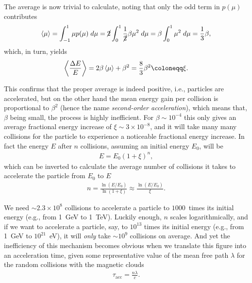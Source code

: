 The average is now trivial to calculate, noting that only the odd term in $p(\mu)$
contributes
\begin{align*}
  \left<\mu\right> = \int_{-1}^1 \mu p(\mu) \;d{\mu} =
  \cancel{2} \int_{0}^1 \frac{1}{\cancel{2}} \beta \mu^2 \;d{\mu} =
  \beta \int_0^1 \mu^2 \;d{\mu} =
  \frac{1}{3} \beta,
\end{align*}
which, in turn, yields
\begin{align}\label{eq:fermi_average}
  \left< \frac{\Delta E}{E} \right> = 2 \beta \ave{\mu} + \beta^2 =
  \frac{8}{3} \beta^2 \coloneqq \xi.
\end{align}

This confirms that the proper average is indeed positive, i.e., particles are accelerated,
but on the other hand the mean energy gain per collision is proportional to $\beta^2$
(hence the name \emph{second-order acceleration}), which means that, $\beta$ being
small, the process is highly inefficient. For $\beta \sim 10^{-4}$ this only gives
an average fractional energy increase of $\xi \sim 3 \times 10^{-8}$, and it will
take many many collisions for the particle to experience a noticeable fractional
energy increase. In fact the energy $E$ after $n$ collisions, assuming an initial
energy $E_0$, will be
\begin{align*}
  E = E_0 \left( 1 + \xi \right)^n,
\end{align*}
which can be inverted to calculate the average number of collisions it takes to
accelerate the particle from $E_0$ to $E$
\begin{align}\label{eq:fermi_accel_num_collisions}
  n = \frac{\ln(E / E_0)}{\ln(1 + \xi)} \approx \frac{\ln(E / E_0)}{\xi}.
\end{align}

\begin{marginfigure}
  
  \caption{Characteristic cosmic-ray escape and acceleration time as a function
  of energy. Here we assume $\tau_\text{esc} = 80$~Myr at 10~GeV, decreasing
  with energy as $(\nicefrac{E}{E_0})^{-\delta}$ and a collision mean free path
  of 0.1~pc. The shaded band indicates the interval $\delta = 0.3$--$0.6$.}
  \label{fig:fermi_accel_efficiency}
\end{marginfigure}

We need $\sim 2.3 \times 10^8$ collisions to accelerate a particle to $1000$~times
its initial energy (e.g., from 1~GeV to 1~TeV). Luckily enough, $n$ scales logarithmically,
and if we want to accelerate a particle, say, to $10^{13}$ times its initial energy
(e.g., from 1~GeV to $10^{21}$~eV), it will \emph{only} take $\sim 10^9$ collisions
on average. And yet the inefficiency of this mechanism becomes obvious when we translate
this figure into an acceleration time, given some representative value of the mean
free path $\lambda$ for the random collisions with the magnetic clouds
\begin{align*}
  \tau_\text{acc} = \frac{n \lambda}{c}.
\end{align*}

